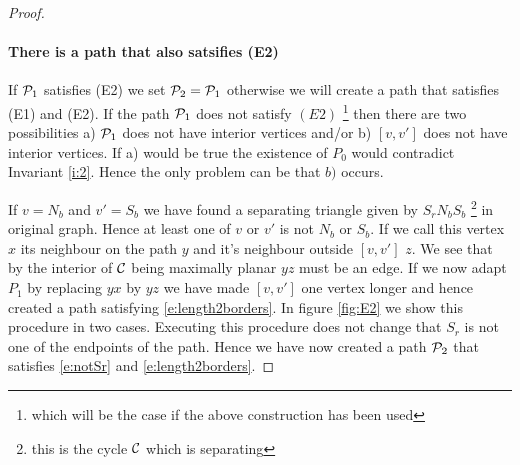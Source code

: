 \begin{proof}
\paragraph{There is a path that also satsifies (E2)}
If $\P_1$ satisfies (E2) we set $\P_2 = \P_1$ otherwise we will create a path that satisfies (E1) and (E2). 
If the path $\P_1$ does not satisfy $(E2)$ \footnote{which will be the case if the above construction has been used} then there are two possibilities  a) $\P_1$ does not have interior vertices and/or b) $[v,v']$ does not have interior vertices. If a) would be true the existence of $P_0$ would contradict Invariant \ref{i:2}. Hence the only problem can be that $b)$ occurs. 

If $v=N_b$ and $v'=S_b$ we have found a separating triangle given by $S_rN_bS_b$ \footnote{this is the cycle $\C$ which is separating} in original graph. Hence at least one of $v$ or $v'$ is not $N_b$ or $S_b$. If we call this vertex $x$ its neighbour on the path $y$ and it's neighbour outside $[v,v']$ $z$. We see that by the interior of $\C$ being maximally planar $yz$ must be an edge. If we now adapt $P_1$ by replacing $yx$ by $yz$ we have made $[v,v']$ one vertex longer and hence created a path satisfying \ref{e:length2borders}. In figure \ref{fig:E2} we show this procedure in two cases. Executing this procedure does not change that $S_r$ is not one of the endpoints of the path. Hence we have now created a path $\P_2$ that satisfies \ref{e:notSr} and \ref{e:length2borders}.


\end{proof}
